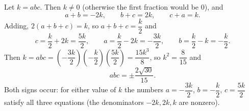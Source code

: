 Let $k=abc$. Then $k\ne0$ (otherwise the first fraction would be $0$), and
\[
a+b=-2k,\qquad b+c=2k,\qquad c+a=k .
\]
Adding, $2(a+b+c)=k$, so $a+b+c=\dfrac {k}{2}$ and
\[
c=\dfrac {k}{2}+2k=\dfrac{5k}{2},\qquad a=\dfrac {k}{2}-2k=-\dfrac{3k}{2},\qquad b=\dfrac {k}{2}-k=-\dfrac {k}{2} .
\]
Then $k=abc=\left(-\dfrac{3k}{2}\right)\left(-\dfrac {k}{2}\right)\left(\dfrac{5k}{2}\right)=\dfrac{15k^3}{8}$, so $k^2=\dfrac{8}{15}$ and
\[
abc=\boxed{\pm\dfrac{2\sqrt{30}}{15}}.
\]
Both signs occur: for either value of $k$ the numbers $a=-\dfrac{3k}{2}$, $b=-\dfrac {k}{2}$, $c=\dfrac{5k}{2}$ satisfy all three equations (the denominators $-2k,2k,k$ are nonzero).
